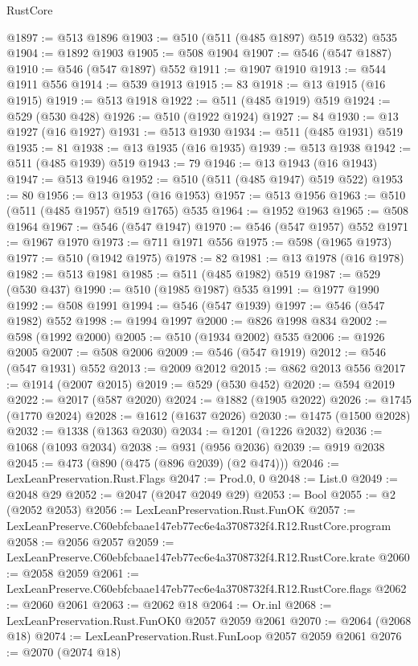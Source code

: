 \begin{lexlean}{RustCore}
\begin{coremodule}
@1897 := @513 @1896
@1903 := @510 (@511 (@485 @1897) @519 @532) @535
@1904 := @1892 @1903
@1905 := @508 @1904
@1907 := @546 (@547 @1887)
@1910 := @546 (@547 @1897) @552
@1911 := @1907 @1910
@1913 := @544 @1911 @556
@1914 := @539 @1913
@1915 := 83
@1918 := @13 @1915 (@16 @1915)
@1919 := @513 @1918
@1922 := @511 (@485 @1919) @519
@1924 := @529 (@530 @428)
@1926 := @510 (@1922 @1924)
@1927 := 84
@1930 := @13 @1927 (@16 @1927)
@1931 := @513 @1930
@1934 := @511 (@485 @1931) @519
@1935 := 81
@1938 := @13 @1935 (@16 @1935)
@1939 := @513 @1938
@1942 := @511 (@485 @1939) @519
@1943 := 79
@1946 := @13 @1943 (@16 @1943)
@1947 := @513 @1946
@1952 := @510 (@511 (@485 @1947) @519 @522)
@1953 := 80
@1956 := @13 @1953 (@16 @1953)
@1957 := @513 @1956
@1963 := @510 (@511 (@485 @1957) @519 @1765) @535
@1964 := @1952 @1963
@1965 := @508 @1964
@1967 := @546 (@547 @1947)
@1970 := @546 (@547 @1957) @552
@1971 := @1967 @1970
@1973 := @711 @1971 @556
@1975 := @598 (@1965 @1973)
@1977 := @510 (@1942 @1975)
@1978 := 82
@1981 := @13 @1978 (@16 @1978)
@1982 := @513 @1981
@1985 := @511 (@485 @1982) @519
@1987 := @529 (@530 @437)
@1990 := @510 (@1985 @1987) @535
@1991 := @1977 @1990
@1992 := @508 @1991
@1994 := @546 (@547 @1939)
@1997 := @546 (@547 @1982) @552
@1998 := @1994 @1997
@2000 := @826 @1998 @834
@2002 := @598 (@1992 @2000)
@2005 := @510 (@1934 @2002) @535
@2006 := @1926 @2005
@2007 := @508 @2006
@2009 := @546 (@547 @1919)
@2012 := @546 (@547 @1931) @552
@2013 := @2009 @2012
@2015 := @862 @2013 @556
@2017 := @1914 (@2007 @2015)
@2019 := @529 (@530 @452)
@2020 := @594 @2019
@2022 := @2017 (@587 @2020)
@2024 := @1882 (@1905 @2022)
@2026 := @1745 (@1770 @2024)
@2028 := @1612 (@1637 @2026)
@2030 := @1475 (@1500 @2028)
@2032 := @1338 (@1363 @2030)
@2034 := @1201 (@1226 @2032)
@2036 := @1068 (@1093 @2034)
@2038 := @931 (@956 @2036)
@2039 := @919 @2038
@2045 := @473 (@890 (@475 (@896 @2039) (@2 @474)))
@2046 := LexLeanPreservation.Rust.Flags
@2047 := Prod.{0, 0}
@2048 := List.{0}
@2049 := @2048 @29
@2052 := @2047 (@2047 @2049 @29)
@2053 := Bool
@2055 := @2 (@2052 @2053)
@2056 := LexLeanPreservation.Rust.FunOK
@2057 := LexLeanPreserve.C60ebfcbaae147eb77ec6e4a3708732f4.R12.RustCore.program
@2058 := @2056 @2057
@2059 := LexLeanPreserve.C60ebfcbaae147eb77ec6e4a3708732f4.R12.RustCore.krate
@2060 := @2058 @2059
@2061 := LexLeanPreserve.C60ebfcbaae147eb77ec6e4a3708732f4.R12.RustCore.flags
@2062 := @2060 @2061
@2063 := @2062 @18
@2064 := Or.inl
@2068 := LexLeanPreservation.Rust.FunOK0 @2057 @2059 @2061
@2070 := @2064 (@2068 @18)
@2074 := LexLeanPreservation.Rust.FunLoop @2057 @2059 @2061
@2076 := @2070 (@2074 @18)

\end{coremodule}
\end{lexlean}
